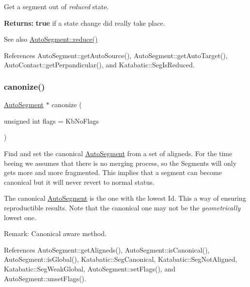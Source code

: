 Get a segment out of {\itshape reduced} state.

{\bfseries Returns\+:} {\bfseries true} if a state change did really take place.

\begin{DoxySeeAlso}{See also}
\mbox{\hyperlink{classKatabatic_1_1AutoSegment_a27a6a2c747ff93d209878a32d97e9157}{Auto\+Segment\+::reduce()}} 
\end{DoxySeeAlso}


References Auto\+Segment\+::get\+Auto\+Source(), Auto\+Segment\+::get\+Auto\+Target(), Auto\+Contact\+::get\+Perpandicular(), and Katabatic\+::\+Seg\+Is\+Reduced.

\mbox{\label{classKatabatic_1_1AutoSegment_a8b0d5044dce091d06b633848a6f8a66d}} 
\subsubsection{\texorpdfstring{canonize()}{canonize()}}
{\footnotesize\ttfamily \mbox{\hyperlink{classKatabatic_1_1AutoSegment}{Auto\+Segment}} $\ast$ canonize (\begin{DoxyParamCaption}\item[{unsigned int}]{flags = {\ttfamily KbNoFlags} }\end{DoxyParamCaption})}

Find and set the canonical \mbox{\hyperlink{classKatabatic_1_1AutoSegment}{Auto\+Segment}} from a set of aligneds. For the time beeing we assumes that there is no merging process, so the Segments will only gets more and more fragmented. This implies that a segment can become canonical but it will never revert to normal status.

The canonical \mbox{\hyperlink{classKatabatic_1_1AutoSegment}{Auto\+Segment}} is the one with the lowest {\ttfamily Id}. This a way of ensuring reproductible results. Note that the canonical one may not be the {\itshape geometrically} lowest one.

\begin{DoxyParagraph}{Remark\+: Canonical aware method. }

\end{DoxyParagraph}


References Auto\+Segment\+::get\+Aligneds(), Auto\+Segment\+::is\+Canonical(), Auto\+Segment\+::is\+Global(), Katabatic\+::\+Seg\+Canonical, Katabatic\+::\+Seg\+Not\+Aligned, Katabatic\+::\+Seg\+Weak\+Global, Auto\+Segment\+::set\+Flags(), and Auto\+Segment\+::unset\+Flags().



